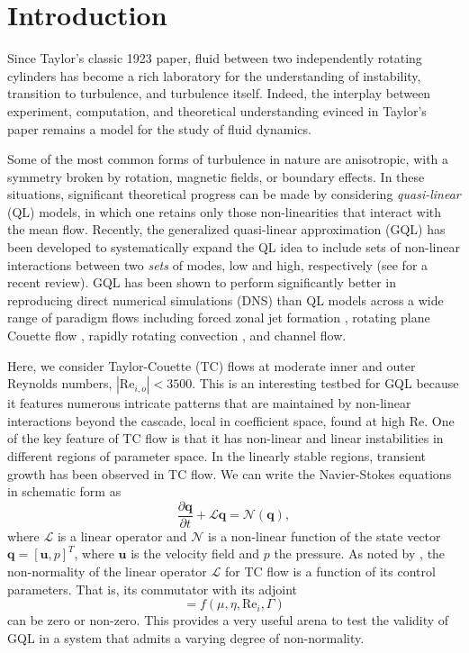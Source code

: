 \documentclass[openacc]{rstransa}%
\newcommand{\Reyn}{\mathrm{Re}}
\newcommand{\Lop}{\mathcal{L}}
\begin{document}
\section{Introduction}
\label{sec:intro}
Since Taylor's classic 1923 paper\cite{1923RSPTA.223..289T}, fluid between two independently rotating cylinders has become a rich laboratory for the understanding of instability, transition to turbulence, and turbulence itself. Indeed, the interplay between experiment, computation, and theoretical understanding evinced in Taylor's paper remains a model for the study of fluid dynamics.

Some of the most common forms of turbulence in nature are anisotropic, with a symmetry broken by rotation, magnetic fields, or boundary effects. In these situations, significant theoretical progress can be made by considering \emph{quasi-linear} (QL) models, in which one retains only those non-linearities that interact with the mean flow. Recently, the generalized quasi-linear approximation (GQL) has been developed to systematically expand the QL idea to include sets of non-linear interactions between two \emph{sets} of modes, low and high, respectively (see \cite{2022arXiv220505513M} for a recent review). GQL has been shown to perform significantly better in reproducing direct numerical simulations (DNS) than QL models across a wide range of paradigm flows including forced zonal jet formation \cite{2016PhRvL.116u4501M}, rotating plane Couette flow \cite{2017JFM...810..412T}, rapidly rotating convection \cite{2018RSPSA.47480422T}, and channel flow\cite{2019Kellam}.

Here, we consider Taylor-Couette (TC) flows at moderate inner and outer Reynolds numbers, $|\Reyn_{i,o}| < 3500$. This is an interesting testbed for GQL because it features numerous intricate patterns that are maintained by non-linear interactions beyond the cascade, local in coefficient space, found at high $\Reyn$. 
One of the key feature of TC flow is that it has non-linear and linear instabilities in different regions of parameter space. In the linearly stable regions, transient growth has been observed in TC flow\cite{2002PhFl...14.3475H, 2002PhFl...14.1655M}. 
We can write the Navier-Stokes equations in schematic form as
\begin{equation}
    \label{eqn:NS-schematic}
    \frac{\partial \mathbf{q}}{\partial t} + \Lop \mathbf{q} = \mathcal{N}(\mathbf{q}),
\end{equation}
where $\Lop$ is a linear operator and $\mathcal{N}$ is a non-linear function of the state vector $\mathbf{q} = \left[ \mathbf{u},  p\right]^T$, where $\mathbf{u}$ is the velocity field and $p$ the pressure.
As noted by \cite{2002PhFl...14.3475H}, the non-normality of the linear operator $\Lop$ for TC flow is a function of its control parameters.
That is, its commutator with its adjoint
\begin{equation}
    [\Lop^\dagger, \Lop] = f(\mu, \eta, \Reyn_i, \Gamma)
\end{equation}
can be zero or non-zero. 
This provides a very useful arena to test the validity of GQL in a system that admits a varying degree of non-normality.
\end{document}
